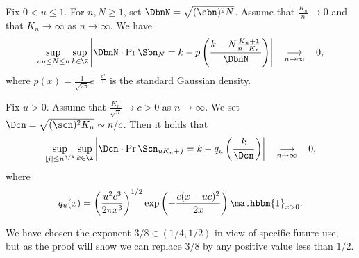 \begin{lemma} \label{lem:ll1}
  Fix $0<u \leq 1$. For $n,N \geq 1$,  set  $\DbnN= \sqrt{ (\sbn)^{2}  N}$. Assume that $ \tfrac{K_{n}}{n} \rightarrow 0$ and that $K_{n} \rightarrow \infty$ as $n \rightarrow \infty$.
  We have
  \[  \sup_{un \leq N  \leq n} \sup_{k \in \Z  } \left|  \DbnN  \cdot \Pr{\Sbn_N=k}
  -   p \left( \frac{k- N\tfrac{K_n+1}{n-K_n}}
  {  \DbnN  }\right)\right|  \quad \mathop{\longrightarrow}_{n \rightarrow \infty} \quad 0,\]
  where $p(x)= \frac{1}{\sqrt{2 \pi}} e^{- \frac{x^{2}}{2}}$ is the standard Gaussian density.
  \label{lem:ll1Uniforme}
\end{lemma}



\begin{lemma}\label{lem:ll2}
 Fix $u>0$. Assume that $ \tfrac{K_{n}}{\sqrt{n}} \rightarrow c>0$ as $n \rightarrow \infty$.  We set $\Dcn=\sqrt{ (\scn)^{2} K_{n} } \sim n /c$.
 Then it holds that
\[ \sup_{|j| \leq n^{3/8}} \sup_{k \in \Z} \left|  \Dcn \cdot \Pr{\Scn_{ uK_{n}  + j }=k} -  q_{u} \left( \frac{k}{  \Dcn }\right)\right|  \quad \mathop{\longrightarrow}_{n \rightarrow \infty} \quad 0,\]
where
\begin{equation}
\label{eq:defqu}q_{u}(x)=\left( \frac{u^{2} c^{3}}{2 \pi x^{3}} \right)^{1/2} \exp \left(  - \frac{c (x-uc)^{2} }{2x} \right) \mathbbm{1}_{x>0}.
\end{equation}\end{lemma}


We have chosen the exponent $3/8 \in (1/4,1/2)$ in view of specific future use,  but as the proof will show we can replace $3/8$ by  any positive value less than $1/2$.

